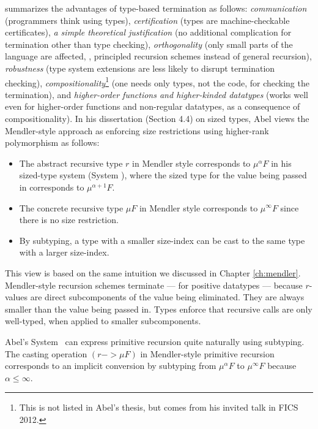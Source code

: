 \citet{abel06phd,Abel12talkFICS} summarizes the advantages of
type-based termination as follows:
\emph{communication} (programmers think using types),
\emph{certification} (types are machine-checkable certificates),
\emph{a simple theoretical justification}
        (no additional complication for termination other than type checking),
\emph{orthogonality} (only small parts of the language are affected,
        \eg, principled recursion schemes instead of general recursion),
\emph{robustness} (type system extensions are less likely to
                        disrupt termination checking),
\emph{compositionality}\footnote{This is not listed in Abel's thesis,
                                but comes from his invited talk in FICS 2012.}
        (one needs only types, not the code, for checking the termination), and
\emph{higher-order functions and higher-kinded datatypes}
        (works well even for higher-order functions and non-regular datatypes,
        as a consequence of compositionality).
In his dissertation \cite{abel06phd} (Section 4.4) on sized types,
Abel views the Mendler-style approach as enforcing size restrictions
using higher-rank polymorphism as follows:
\begin{itemize}
\item The abstract recursive type $r$ in Mendler style corresponds to
        $\mu^\alpha F$ in his sized-type system (System \Fwhat),
        where the sized type
        for the value being passed in corresponds to $\mu^{\alpha+1} F$.
\item The concrete recursive type $\mu F$ in Mendler style corresponds to
        $\mu^\infty F$ since there is no size restriction.
\item {}
	By subtyping, a type with a smaller size-index can be cast to
        the same type with a larger size-index.
\end{itemize}
This view is based on the same intuition we discussed in
Chapter \ref{ch:mendler}. Mendler-style recursion schemes terminate --- for
positive datatypes --- because $r$-values are direct subcomponents
of the value being eliminated. They are always smaller
than the value being passed in. Types enforce that recursive calls
are only well-typed, when applied to smaller subcomponents.

Abel's System \Fwhat\ can express primitive recursion quite naturally
using subtyping. The casting operation $(r -> \mu F)$ in Mendler-style
primitive recursion corresponds to an implicit conversion by subtyping
from $\mu^\alpha F$ to $\mu^\infty F$ because $\alpha \leq \infty$.

